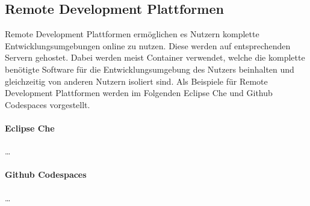 \subsection{Remote Development Plattformen}\label{section:stand-der-technik:weitere-entwicklungen:remote-development-plattformen}

Remote Development Plattformen ermöglichen es Nutzern komplette Entwicklungsumgebungen online zu nutzen. Diese werden auf entsprechenden Servern gehostet. Dabei werden meist Container verwendet, welche die komplette benötigte Software für die Entwicklungsumgebung des Nutzers beinhalten und gleichzeitig von anderen Nutzern isoliert sind. Als Beispiele für Remote Development Plattformen werden im Folgenden Eclipse Che \cite{noauthor_eclipse-che_nodate} und Github Codespaces \cite{noauthor_github-codespaces_2024} vorgestellt.

\paragraph{Eclipse Che} \dots

\paragraph{Github Codespaces} \dots

